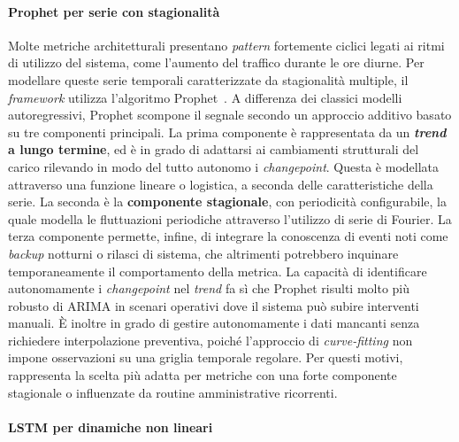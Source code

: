\paragraph{Prophet per serie con stagionalità}

Molte metriche architetturali presentano \textit{pattern} fortemente ciclici legati ai ritmi di
utilizzo del sistema, come l'aumento del traffico durante le ore diurne. Per modellare queste serie
temporali caratterizzate da stagionalità multiple, il \textit{framework} utilizza l'algoritmo
Prophet~\cite{taylor2018forecasting}. A differenza dei classici modelli autoregressivi, Prophet
scompone il segnale secondo un approccio additivo basato su tre componenti principali. La prima
componente è rappresentata da un \textbf{\textit{trend} a lungo termine}, ed è in grado di
adattarsi ai cambiamenti strutturali del carico rilevando in modo del tutto autonomo i
\textit{changepoint}. Questa è modellata attraverso una funzione lineare o logistica, a seconda delle
caratteristiche della serie. La seconda è la \textbf{componente stagionale}, con periodicità
configurabile, la quale modella le fluttuazioni periodiche attraverso l'utilizzo di serie di Fourier.
La terza componente permette, infine, di integrare la conoscenza di eventi noti come
\textit{backup} notturni o rilasci di sistema, che altrimenti potrebbero inquinare temporaneamente
il comportamento della metrica.
La capacità di identificare autonomamente i \textit{changepoint} nel \textit{trend} fa sì che
Prophet risulti molto più robusto di ARIMA in scenari operativi dove il sistema può subire
interventi manuali. È inoltre in grado di gestire autonomamente i dati mancanti senza richiedere
interpolazione preventiva, poiché l'approccio di \textit{curve-fitting} non impone osservazioni su
una griglia temporale regolare. Per questi motivi, rappresenta la scelta più adatta per metriche
con una forte componente stagionale o influenzate da routine amministrative ricorrenti.

\paragraph{LSTM per dinamiche non lineari}

